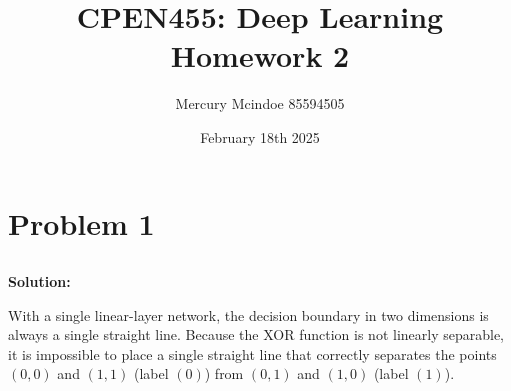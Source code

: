 \documentclass{article}
\title{CPEN455: Deep Learning \\ Homework 2}
\author{Mercury Mcindoe 85594505}
\date{February 18th 2025}
\newenvironment{solution}
  {\par\noindent\textbf{Solution:}\par}
  {\par}
\begin{document}
\pagestyle{fancy}
\fancyhead{} %

\maketitle
\thispagestyle{fancy}


\section{Problem 1}
\subsection{}
\begin{solution}
With a single linear-layer network, the decision boundary in two dimensions is always a single straight line. 
Because the XOR function is not linearly separable, it is impossible to place a single straight line that 
correctly separates the points $(0,0)$ and $(1,1)$ (label $(0)$) from $(0,1)$ and $(1,0)$ (label $(1)$).
\end{solution}
\end{document}
